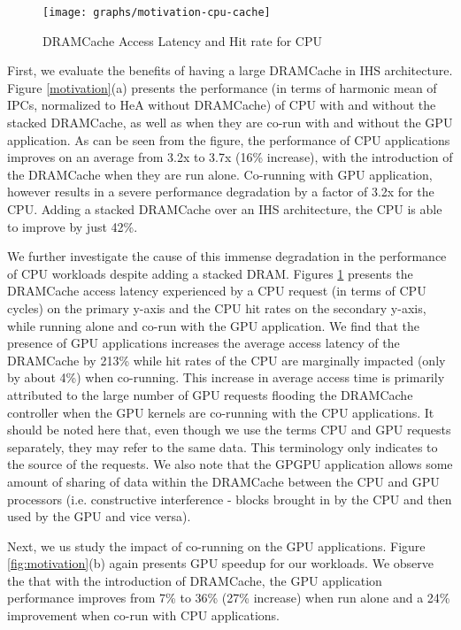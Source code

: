 \begin{figure}[htb]
   \texttt{[image: graphs/motivation-cpu-cache]}
   \caption{DRAMCache Access Latency and Hit rate for CPU}
   \label{fig:motivation-cpu-cache}
\end{figure}
First, we evaluate the benefits of having a large DRAMCache in IHS architecture. Figure \ref{motivation}(a) presents the performance
(in terms of harmonic mean of IPCs, normalized to HeA without DRAMCache) of CPU with and without
the stacked DRAMCache, as well as when they are co-run with and without the GPU application. As can be seen from the figure,
the performance of CPU applications improves on an average from 3.2x to 3.7x (16\% increase), with the introduction 
of the DRAMCache when they are run alone. Co-running with GPU application, however results in a severe performance degradation by a factor of 3.2x for the CPU. 
Adding a stacked DRAMCache over an IHS architecture, the CPU is able to improve by just 42\%.
\par We further investigate the cause of this immense degradation in the performance of CPU workloads despite adding a stacked DRAM. Figures \ref{fig:motivation-cpu-cache} presents the DRAMCache access latency experienced by a CPU request (in terms of CPU cycles) on the primary y-axis and the CPU hit rates on the secondary y-axis, while running alone and co-run with the GPU application. We find that the presence of GPU applications increases the average access latency of the DRAMCache by 213\% while hit rates of the CPU are marginally impacted (only by about 4\%) when co-running.
This increase in average access time is primarily attributed to the large
number of GPU requests flooding the DRAMCache controller when the GPU kernels are co-running with the CPU applications.
It should be noted here that, even though we use the terms CPU and GPU requests separately, they may refer to the same data. This terminology only indicates to the source of the requests. We also note that the GPGPU application allows some amount of sharing of data within the DRAMCache between the CPU and GPU processors (i.e. constructive interference - blocks brought in by the CPU and then used by the GPU and vice versa).
\par Next, we us study the impact of co-running on the GPU applications.  Figure \ref{fig:motivation}(b) again presents GPU speedup 
for our workloads. 
We observe the that with the introduction of DRAMCache, the GPU application performance improves from 7\% to 36\% (27\% increase) when run alone and a 24\% improvement when co-run with CPU applications.
